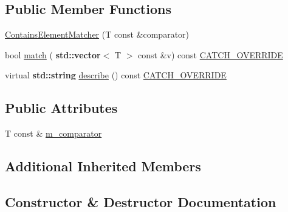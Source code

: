 \subsection*{Public Member Functions}
\begin{DoxyCompactItemize}
\item 
\hyperlink{struct_catch_1_1_matchers_1_1_vector_1_1_contains_element_matcher_a6a05740b5d3f89fac8de84ac0cff7b93}{Contains\+Element\+Matcher} (T const \&comparator)
\item 
bool \hyperlink{struct_catch_1_1_matchers_1_1_vector_1_1_contains_element_matcher_a95fd99879bcfbe129898bef922c92c17}{match} (\textbf{ std\+::vector}$<$ T $>$ const \&v) const \hyperlink{catch_8hpp_a8ecdce4d3f57835f707915ae831eb847}{C\+A\+T\+C\+H\+\_\+\+O\+V\+E\+R\+R\+I\+DE}
\item 
virtual \textbf{ std\+::string} \hyperlink{struct_catch_1_1_matchers_1_1_vector_1_1_contains_element_matcher_a5a869772714dd045816707b74b217664}{describe} () const \hyperlink{catch_8hpp_a8ecdce4d3f57835f707915ae831eb847}{C\+A\+T\+C\+H\+\_\+\+O\+V\+E\+R\+R\+I\+DE}
\end{DoxyCompactItemize}
\subsection*{Public Attributes}
\begin{DoxyCompactItemize}
\item 
T const  \& \hyperlink{struct_catch_1_1_matchers_1_1_vector_1_1_contains_element_matcher_ab7eada6c4bbce1d21b44773262f9cb23}{m\+\_\+comparator}
\end{DoxyCompactItemize}
\subsection*{Additional Inherited Members}


\subsection{Constructor \& Destructor Documentation}
\mbox{\label{struct_catch_1_1_matchers_1_1_vector_1_1_contains_element_matcher_a6a05740b5d3f89fac8de84ac0cff7b93}} 
